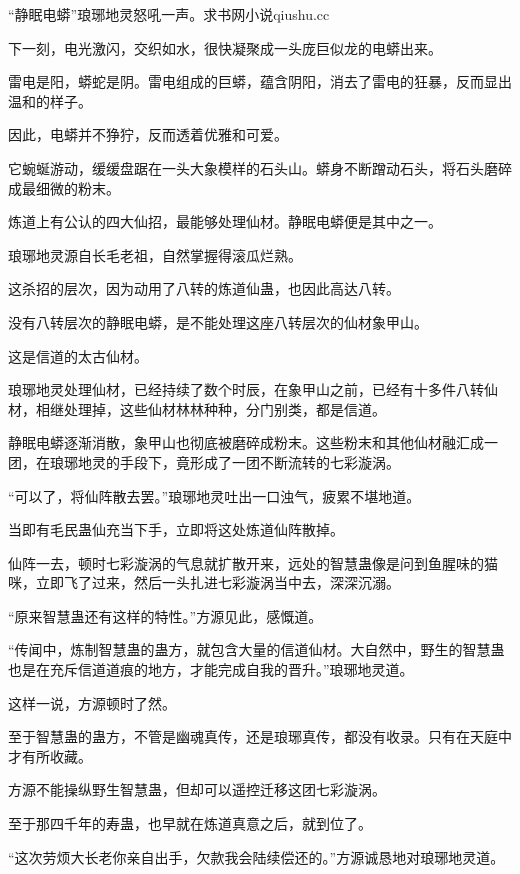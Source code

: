 
\begin{this_body}

“静眠电蟒”琅琊地灵怒吼一声。求书网小说qiushu.cc

下一刻，电光激闪，交织如水，很快凝聚成一头庞巨似龙的电蟒出来。

雷电是阳，蟒蛇是阴。雷电组成的巨蟒，蕴含阴阳，消去了雷电的狂暴，反而显出温和的样子。

因此，电蟒并不狰狞，反而透着优雅和可爱。

它蜿蜒游动，缓缓盘踞在一头大象模样的石头山。蟒身不断蹭动石头，将石头磨碎成最细微的粉末。

炼道上有公认的四大仙招，最能够处理仙材。静眠电蟒便是其中之一。

琅琊地灵源自长毛老祖，自然掌握得滚瓜烂熟。

这杀招的层次，因为动用了八转的炼道仙蛊，也因此高达八转。

没有八转层次的静眠电蟒，是不能处理这座八转层次的仙材象甲山。

这是信道的太古仙材。

琅琊地灵处理仙材，已经持续了数个时辰，在象甲山之前，已经有十多件八转仙材，相继处理掉，这些仙材林林种种，分门别类，都是信道。

静眠电蟒逐渐消散，象甲山也彻底被磨碎成粉末。这些粉末和其他仙材融汇成一团，在琅琊地灵的手段下，竟形成了一团不断流转的七彩漩涡。

“可以了，将仙阵散去罢。”琅琊地灵吐出一口浊气，疲累不堪地道。

当即有毛民蛊仙充当下手，立即将这处炼道仙阵散掉。

仙阵一去，顿时七彩漩涡的气息就扩散开来，远处的智慧蛊像是问到鱼腥味的猫咪，立即飞了过来，然后一头扎进七彩漩涡当中去，深深沉溺。

“原来智慧蛊还有这样的特性。”方源见此，感慨道。

“传闻中，炼制智慧蛊的蛊方，就包含大量的信道仙材。大自然中，野生的智慧蛊也是在充斥信道道痕的地方，才能完成自我的晋升。”琅琊地灵道。

这样一说，方源顿时了然。

至于智慧蛊的蛊方，不管是幽魂真传，还是琅琊真传，都没有收录。只有在天庭中才有所收藏。

方源不能操纵野生智慧蛊，但却可以遥控迁移这团七彩漩涡。

至于那四千年的寿蛊，也早就在炼道真意之后，就到位了。

“这次劳烦大长老你亲自出手，欠款我会陆续偿还的。”方源诚恳地对琅琊地灵道。


\end{this_body}
